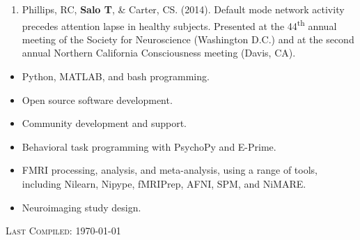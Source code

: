 \documentclass[10pt]{article}
\newenvironment{bottompar}{\par\vspace*{\fill}}{\clearpage}
\newcommand{\headstyle}{\scshape \normalsize \textcolor{light-gray}}
\newcommand{\sectionstyle}{\LARGE \fontfamily{lmr}\selectfont}
\begin{document}
\begin{enumerate}
	\item Phillips, RC, \textbf{Salo T}, \& Carter, CS. (2014).
	Default mode network activity precedes attention lapse in healthy subjects.
	Presented at the 44\textsuperscript{th} annual meeting of the Society for
	Neuroscience (Washington D.C.) and at the second annual Northern California
	Consciousness meeting (Davis, CA).

\end{enumerate}

\bigskip

\begin{center}\sectionstyle{ADDITIONAL SKILLS}\end{center}

\begin{itemize}

	\item Python, MATLAB, and bash programming.

	\item Open source software development.

	\item Community development and support.

	\item Behavioral task programming with PsychoPy and E-Prime.

	\item FMRI processing, analysis, and meta-analysis, using a range of tools, including Nilearn, Nipype, fMRIPrep, AFNI, SPM, and NiMARE.

	\item Neuroimaging study design.

\end{itemize}

\begin{bottompar}
	\begin{center}
		\headstyle{Last Compiled: \today}
	\end{center}
\end{bottompar}
\end{document}
